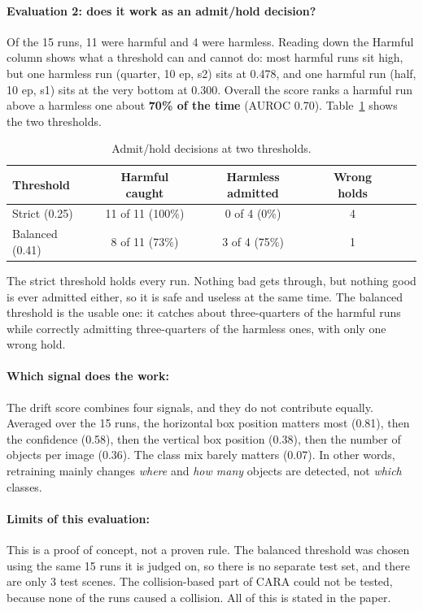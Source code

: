 \documentclass[11pt,a4paper]{article}
\begin{document}
\paragraph{Evaluation 2: does it work as an admit/hold decision?} Of the 15 runs,
11 were harmful and 4 were harmless. Reading down the Harmful column shows what a
threshold can and cannot do: most harmful runs sit high, but one harmless run
(quarter, 10 ep, s2) sits at 0.478, and one harmful run (half, 10 ep, s1) sits at
the very bottom at 0.300. Overall the score ranks a harmful run above a harmless
one about \textbf{70\% of the time} (AUROC 0.70). Table~\ref{tab:thresh} shows
the two thresholds.

\begin{table}[h!]
\centering
\caption{Admit/hold decisions at two thresholds.}
\label{tab:thresh}
\small
\renewcommand{\arraystretch}{1.25}
\begin{tabular}{@{}lccccc@{}}
\toprule
\textbf{Threshold} & \textbf{Harmful caught} & \textbf{Harmless admitted} & \textbf{Wrong holds} \\
\midrule
Strict (0.25)   & 11 of 11 (100\%) & 0 of 4 (0\%)  & 4 \\
Balanced (0.41) & 8 of 11 (73\%)   & 3 of 4 (75\%) & 1 \\
\bottomrule
\end{tabular}
\end{table}

\noindent
The strict threshold holds every run. Nothing bad gets through, but nothing good
is ever admitted either, so it is safe and useless at the same time. The balanced
threshold is the usable one: it catches about three-quarters of the harmful runs
while correctly admitting three-quarters of the harmless ones, with only one
wrong hold.

\paragraph{Which signal does the work:} The drift score combines four signals,
and they do not contribute equally. Averaged over the 15 runs, the horizontal box
position matters most (0.81), then the confidence (0.58), then the vertical box
position (0.38), then the number of objects per image (0.36). The class mix
barely matters (0.07). In other words, retraining mainly changes \emph{where} and
\emph{how many} objects are detected, not \emph{which} classes.

\paragraph{Limits of this evaluation:} This is a proof of concept, not a proven
rule. The balanced threshold was chosen using the same 15 runs it is judged on,
so there is no separate test set, and there are only 3 test scenes. The
collision-based part of CARA could not be tested, because none of the runs caused
a collision. All of this is stated in the paper.
\end{document}
